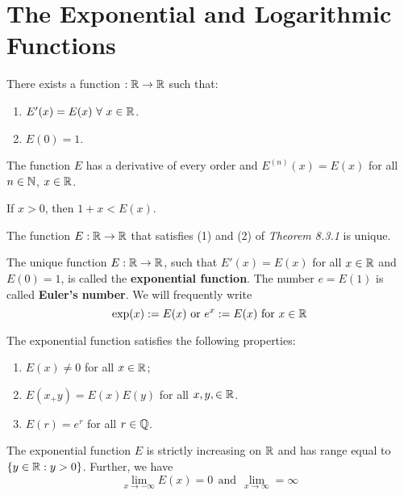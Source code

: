 \section{The Exponential and Logarithmic Functions}

\begin{theorem}
	There exists a function $:\mathbb{R} \to \mathbb{R}$ such that:
	\begin{enumerate}
		\item $E'(x)=E(x)\ \forall\ x \in \mathbb{R}$.
		\item $E(0)=1$.
	\end{enumerate}
\end{theorem}

\begin{corollary}
	The function $E$ has a derivative of every order and $E^{(n)}(x)=E(x)$ for all $n \in \mathbb{N}$, $x \in \mathbb{R}$.
\end{corollary}

\begin{corollary}
	If $x>0$, then $1+x < E(x)$.
\end{corollary}

\begin{theorem}
	The function $E:\mathbb{R}\to\mathbb{R}$ that satisfies (1) and (2) of \textit{Theorem 8.3.1} is unique.
\end{theorem}

\begin{theorem}
	The unique function $E:\mathbb{R}\to\mathbb{R}$, such that $E'(x)=E(x)$ for all $x \in \mathbb{R}$ and $E(0)=1$, is called the \textbf{exponential function}. The number $e=E(1)$ is called \textbf{Euler's number}. We will frequently write
	\[\exp(x):=E(x)\ \text{or}\  e^x:=E(x)\ \text{for}\ x \in \R\]
\end{theorem}

\begin{theorem}
	The exponential function satisfies the following properties:
	\begin{enumerate}
		\item $E(x) \neq 0$ for all $x \in \mathbb{R}$;
		\item $E(x_+y)=E(x)E(y)$ for all $x,y,\in\mathbb{R}$.
		\item $E(r) = e^r$ for all $r \in \mathbb{Q}$.
	\end{enumerate}
\end{theorem}

\begin{theorem}
	The exponential function $E$ is strictly increasing on $\mathbb{R}$ and has range equal to $\{y \in \mathbb{R} : y > 0\}$. Further, we have
	\[\lim\limits_{x \to -\infty} E(x)=0\ \ \text{and}\ \ \lim\limits_{x \to \infty} = \infty\]
\end{theorem}

